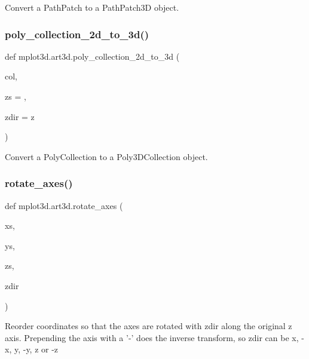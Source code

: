 \begin{DoxyVerb}Convert a PathPatch to a PathPatch3D object.\end{DoxyVerb}
 \mbox{\label{namespacemplot3d_1_1art3d_aec62e64d4d408e7099b314aba960ad18}} 
\subsubsection{\texorpdfstring{poly\+\_\+collection\+\_\+2d\+\_\+to\+\_\+3d()}{poly\_collection\_2d\_to\_3d()}}
{\footnotesize\ttfamily def mplot3d.\+art3d.\+poly\+\_\+collection\+\_\+2d\+\_\+to\+\_\+3d (\begin{DoxyParamCaption}\item[{}]{col,  }\item[{}]{zs = {},  }\item[{}]{zdir = {\ttfamily \textquotesingle{}z\textquotesingle{}} }\end{DoxyParamCaption})}

\begin{DoxyVerb}Convert a PolyCollection to a Poly3DCollection object.\end{DoxyVerb}
 \mbox{\label{namespacemplot3d_1_1art3d_af7d66f4517b1fa207956e9ec72ab26d1}} 
\subsubsection{\texorpdfstring{rotate\+\_\+axes()}{rotate\_axes()}}
{\footnotesize\ttfamily def mplot3d.\+art3d.\+rotate\+\_\+axes (\begin{DoxyParamCaption}\item[{}]{xs,  }\item[{}]{ys,  }\item[{}]{zs,  }\item[{}]{zdir }\end{DoxyParamCaption})}

\begin{DoxyVerb}Reorder coordinates so that the axes are rotated with zdir along
the original z axis. Prepending the axis with a '-' does the
inverse transform, so zdir can be x, -x, y, -y, z or -z
\end{DoxyVerb}
 \mbox{\label{namespacemplot3d_1_1art3d_a840e0bb22665293a0de891ffeb8f7d77}} 
